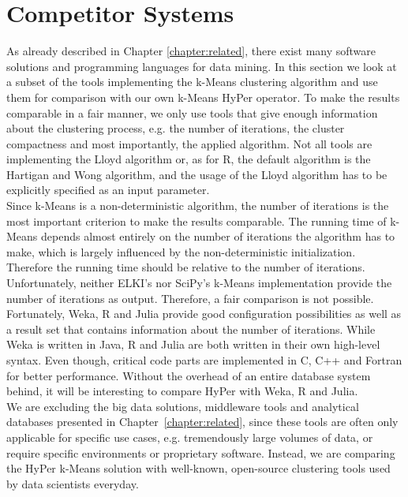 \section{Competitor Systems}

As already described in Chapter \ref{chapter:related}, there exist many software solutions and programming languages for data mining. In this section we look at a subset of the tools implementing the k-Means clustering algorithm and use them for comparison with our own k-Means HyPer operator. To make the results comparable in a fair manner, we only use tools that give enough information about the clustering process, e.g. the number of iterations, the cluster compactness and most importantly, the applied algorithm. Not all tools are implementing the Lloyd algorithm or, as for R, the default algorithm is the Hartigan and Wong algorithm, and the usage of the Lloyd algorithm has to be explicitly specified as an input parameter.
\\
Since k-Means is a non-deterministic algorithm, the number of iterations is the most important criterion to make the results comparable. The running time of k-Means depends almost entirely on the number of iterations the algorithm has to make, which is largely influenced by the non-deterministic initialization. Therefore the running time should be relative to the number of iterations. Unfortunately, neither ELKI's nor SciPy's k-Means implementation provide the number of iterations as output. Therefore, a fair comparison is not possible. Fortunately, Weka, R and Julia provide good configuration possibilities as well as a result set that contains information about the number of iterations. While Weka is written in Java, R and Julia are both written in their own high-level syntax. Even though, critical code parts are implemented in C, C++ and Fortran for better performance. Without the overhead of an entire database system behind, it will be interesting to compare HyPer with Weka, R and Julia.
\\
We are excluding the big data solutions, middleware tools and analytical databases presented in Chapter~\ref{chapter:related}, since these tools are often only applicable for specific use cases, e.g. tremendously large volumes of data, or require specific environments or proprietary software. Instead, we are comparing the HyPer k-Means solution with well-known, open-source clustering tools used by data scientists everyday.
\\
